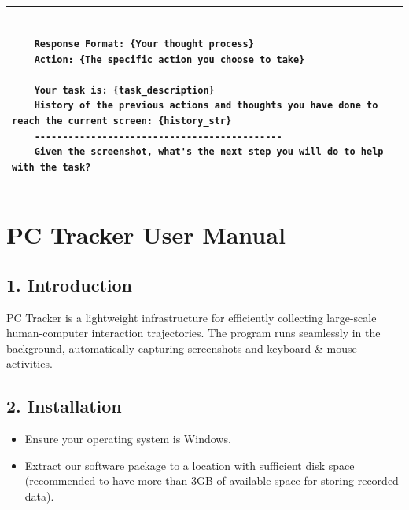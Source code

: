 \documentclass{article} %
\begin{document}
    \clearpage
    \vspace*{-\topskip}
    \vspace{0pt}
    \begin{table}[!t]
    \setlength{\aboverulesep}{0pt}
    \setlength{\belowrulesep}{0pt}
    \setlength{\extrarowheight}{0pt}
    \begin{tabular}{>{\setlength{\parskip}{0.2em}}p{}}
    \begin{lstlisting}[basicstyle=\ttfamily\small]
    
    Response Format: {Your thought process}
    Action: {The specific action you choose to take}

    Your task is: {task_description}
    History of the previous actions and thoughts you have done to reach the current screen: {history_str}
    --------------------------------------------
    Given the screenshot, what's the next step you will do to help with the task?
    \end{lstlisting} \\
    \bottomrule
    \end{tabular}
    \end{table}



\newpage
\section{PC Tracker User Manual}
\label{appendix: manual}

\subsection*{1. Introduction}
PC Tracker is a lightweight infrastructure for efficiently collecting large-scale human-computer interaction trajectories. The program runs seamlessly in the background, automatically capturing screenshots and keyboard \& mouse activities. 

\subsection*{2. Installation}
\begin{itemize}[itemsep=0pt]
    \item Ensure your operating system is Windows.
    \item Extract our software package to a location with sufficient disk space (recommended to have more than 3GB of available space for storing recorded data).
\end{itemize}
\end{document}
